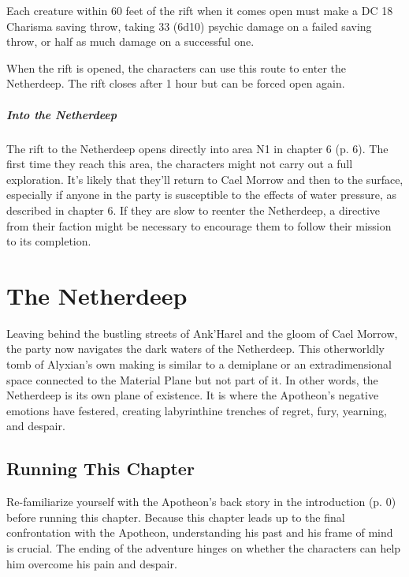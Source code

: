 \documentclass[a4paper, 11pt, bg=full, twocolumn, nooutline]{dndbook}
\begin{document}
Each creature within 60 feet of the rift when it comes open must make a DC 18 Charisma saving throw, taking 33 (6d10) psychic damage on a failed saving throw, or half as much damage on a successful one.

When the rift is opened, the characters can use this route to enter the Netherdeep. The rift closes after 1 hour but can be forced open again.

\paragraph{Into the Netherdeep}

The rift to the Netherdeep opens directly into area N1 in chapter 6 (p. 6). The first time they reach this area, the characters might not carry out a full exploration. It's likely that they'll return to Cael Morrow and then to the surface, especially if anyone in the party is susceptible to the effects of water pressure, as described in chapter 6. If they are slow to reenter the Netherdeep, a directive from their faction might be necessary to encourage them to follow their mission to its completion.

\chapter{The Netherdeep}\label{ch:the-netherdeep-7-7}

Leaving behind the bustling streets of Ank'Harel and the gloom of Cael Morrow, the party now navigates the dark waters of the Netherdeep. This otherworldly tomb of Alyxian's own making is similar to a demiplane or an extradimensional space connected to the Material Plane but not part of it. In other words, the Netherdeep is its own plane of existence. It is where the Apotheon's negative emotions have festered, creating labyrinthine trenches of regret, fury, yearning, and despair.
\section{Running This Chapter}

Re-familiarize yourself with the Apotheon's back story in the introduction (p. 0) before running this chapter. Because this chapter leads up to the final confrontation with the Apotheon, understanding his past and his frame of mind is crucial. The ending of the adventure hinges on whether the characters can help him overcome his pain and despair.
\end{document}
